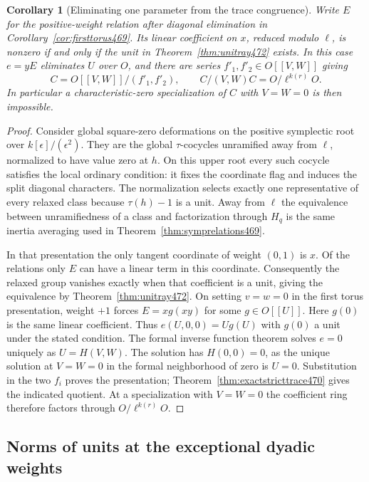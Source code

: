\documentclass[a4paper,11pt]{article}
\newtheorem{corollary}[proposition]{Corollary}
\theoremstyle{definition}
\theoremstyle{remark}
\numberwithin{equation}{section}
\begin{document}
\begin{corollary}[Eliminating one parameter from the trace congruence]\leavevmode
\label{cor:eliminateupper472}
Write \(E\) for the positive-weight relation after diagonal
elimination in Corollary~\ref{cor:firsttorus469}. Its linear
coefficient on \(x\), reduced modulo \(\ell\), is nonzero if
and only if the unit in Theorem~\ref{thm:unitray472} exists.
In this case \(e=yE\) eliminates \(U\) over \(O\), and there are
series \(f'_1,f'_2\in O[[V,W]]\) giving
\[
       C=O[[V,W]]/(f'_1,f'_2),\qquad
       C/(V,W)C=O/\ell^{k(r)}O .
\]
In particular a characteristic-zero specialization of \(C\) with
\(V=W=0\) is then impossible.
\end{corollary}
\begin{proof}
Consider global square-zero deformations on the positive symplectic
root over \(k[\epsilon]/(\epsilon^2)\). They are the global
\(\tau\)-cocycles unramified away from \(\ell\), normalized to
have value zero at \(h\). On this upper root every such cocycle
satisfies the local ordinary condition: it fixes the coordinate
flag and induces the split diagonal characters. The normalization
selects exactly one representative of every relaxed class because
\(\tau(h)-1\) is a unit. Away from \(\ell\) the equivalence between
unramifiedness of a class and factorization through \(H_q\) is
the same inertia averaging used in Theorem~\ref{thm:symprelations469}.

In that presentation the only tangent coordinate of weight
\((0,1)\) is \(x\). Of the relations only \(E\) can have a linear
term in this coordinate. Consequently the relaxed group vanishes
exactly when that coefficient is a unit, giving the equivalence
by Theorem~\ref{thm:unitray472}. On setting \(v=w=0\) in the
first torus presentation, weight \(+1\) forces
\(E=xg(xy)\) for some \(g\in O[[U]]\). Here \(g(0)\) is the same
linear coefficient. Thus \(e(U,0,0)=Ug(U)\) with \(g(0)\) a
unit under the stated condition. The formal inverse function
theorem solves \(e=0\) uniquely as \(U=H(V,W)\). The solution
has \(H(0,0)=0\), as the unique solution at \(V=W=0\) in the
formal neighborhood of zero is \(U=0\). Substitution in the two
\(f_i\) proves the presentation; Theorem~\ref{thm:exactstricttrace470}
gives the indicated quotient. At a specialization with \(V=W=0\)
the coefficient ring therefore factors through \(O/\ell^{k(r)}O\).
\end{proof}



\subsection{Norms of units at the exceptional dyadic weights}
\label{sec:unitnorms505}
\end{document}

